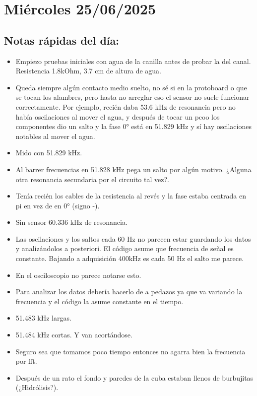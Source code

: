 \section{Miércoles 25/06/2025}

\subsection*{Notas rápidas del día:}
\begin{itemize}
	\item Empiezo pruebas iniciales con agua de la canilla antes de probar la del canal. Resistencia 1.8kOhm, 3.7 cm de altura de agua. 
	\item Queda siempre algún contacto medio suelto, no sé si en la protoboard o que se tocan los alambres, pero hasta no arreglar eso el sensor no suele funcionar correctamente. Por ejemplo, recién daba 53.6 kHz de resonancia pero no había oscilaciones al mover el agua, y después de tocar un pcoo los componentes dio un salto y la fase 0° está en 51.829 kHz y sí hay oscilaciones notables al mover el agua.
	\item Mido con 51.829 kHz. 
	\item Al barrer frecuencias en 51.828 kHz pega un salto por algún motivo. ¿Alguna otra resonancia secundaria por el circuito tal vez?. 
	\item Tenía recién los cables de la resistencia al revés y la fase estaba centrada en pi en vez de en 0° (signo -). 
	\item Sin sensor 60.336 kHz de resonancia. 
	\item Las oscilaciones y los saltos cada 60 Hz no parecen estar guardando los datos y analizándolos a posteriori. El código asume que frecuencia de señal es constante. Bajando a adquisición 400kHz es cada 50 Hz el salto me parece. 
	\item En el osciloscopio no parece notarse esto. 
	\item Para analizar los datos debería hacerlo de a pedazos ya que va variando la frecuencia y el código la asume constante en el tiempo. 
	
	\item 51.483 kHz largas. 
	\item 51.484 kHz cortas. Y van acortándose. 
	\item Seguro sea que tomamos poco tiempo entonces no agarra bien la frecuencia por fft. 
	
	\item Después de un rato el fondo y paredes de la cuba estaban llenos de burbujitas (¿Hidrólisis?). 
	

\end{itemize}
